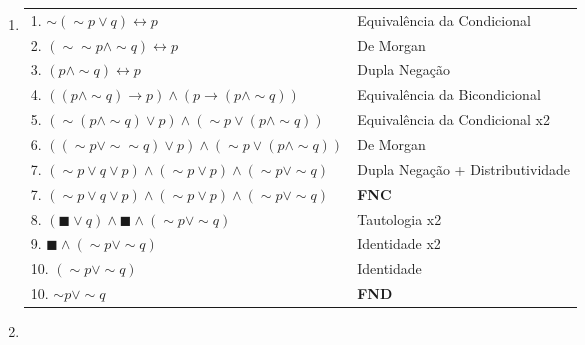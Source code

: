 \documentclass[12pt, a4paper,final]{article}
\begin{document}
\begin{enumerate}
\begin{enumerate}[label=(\alph*), leftmargin = 5mm]
            \item 
            
                \begin{tabular}{ll}
                    1. $\sim(\sim p \vee q) \leftrightarrow p $ & Equivalência da Condicional \\
                    2. $(\sim \sim p \wedge \sim q) \leftrightarrow p$ & De Morgan \\
                    3. $(p \wedge \sim q) \leftrightarrow p$ & Dupla Negação \\
                    4. $((p \wedge \sim q) \rightarrow p) \wedge (p \rightarrow (p \wedge \sim q))$ & Equivalência da Bicondicional \\
                    5. $(\sim(p \wedge \sim q) \vee p) \wedge (\sim p \vee (p \wedge \sim q))$ & Equivalência da Condicional x2 \\
                    6. $((\sim p \vee \sim \sim q) \vee p) \wedge (\sim p \vee (p \wedge \sim q))$ & De Morgan \\
                    7. $(\sim p \vee q \vee p) \wedge (\sim p \vee p) \wedge (\sim p \vee \sim q)$ & Dupla Negação + Distributividade \\
                    7. $(\sim p \vee q \vee p) \wedge (\sim p \vee p) \wedge (\sim p \vee \sim q)$ & \textbf{FNC} \\
                    8. $(\blacksquare \vee q) \wedge \blacksquare \wedge (\sim p \vee \sim q)$ & Tautologia x2 \\
                    9. $\blacksquare \wedge (\sim p \vee \sim q)$ & Identidade x2\\
                    10. $(\sim p \vee \sim q)$ & Identidade \\
                    10. $\sim p \vee \sim q$ & \textbf{FND} \\
                \end{tabular}
            
            \item 
            

\end{enumerate}
\end{enumerate}
\end{document}

